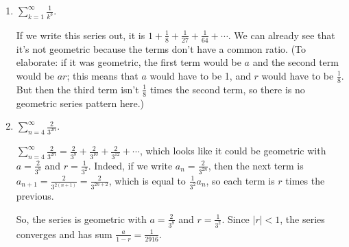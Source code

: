 \documentclass[main]{subfiles}
\begin{document}
\begin{enumerate}[resume]
\begin{enumerate}
\begin{solution}
    To see whether the series really is geometric, we need to make sure
    that the rest of the series follows the pattern that each term is
    $r$ times the previous term.

    If we write the $k$-th term as $a_k = \frac{(-1)^k 2^{k+1}}{3^k}$,
    then the next term is $a_{k+1} = \frac{(-1)^{k + 1} 2^{k+2}}{3^{k +
    1}}$, which is indeed equal to $-\frac{2}{3} a_k$.  So, the
    series is geometric with $a = -\frac{4}{3}$ and $r = -\frac{2}{3}$.
    Since $|r| < 1$, the series converges, and its sum is $\frac{a}{1 -
    r} = -\frac{4}{5}$.
    \end{solution}

    \item
    \begin{problem}[\vfill]
    $\displaystyle \sum_{k=1}^{\infty} \frac{1}{k^3}$.
    \end{problem}

    \begin{solution}
    If we write this series out, it is $1 + \frac{1}{8} + \frac{1}{27} +
    \frac{1}{64} + \cdots$.  We can already see that it's not geometric
    because the terms don't have a common ratio.  (To elaborate: if it
    was geometric, the first term would be $a$ and the second term would
    be $ar$; this means that $a$ would have to be 1, and $r$ would have
    to be $\frac{1}{8}$.  But then the third term isn't $\frac{1}{8}$ times the second term,
    so there is no geometric series pattern here.)
    \end{solution}

    \item
    \begin{problem}[\vfill]
    $\displaystyle \sum_{n=4}^{\infty} \frac{2}{3^{2n}}$.
    \end{problem}

    \begin{solution}
    $\displaystyle \sum_{n=4}^{\infty} \frac{2}{3^{2n}} = \frac{2}{3^8}
    + \frac{2}{3^{10}} + \frac{2}{3^{12}} + \cdots$, which looks like it
    could be geometric with $a = \frac{2}{3^8}$ and $r =
    \frac{1}{3^2}$.  Indeed, if we write $a_n = \frac{2}{3^{2n}}$, then
    the next term is $a_{n+1} = \frac{2}{3^{2 (n+ 1)}} = \frac{2}{3^{2n
    + 2}}$, which is equal to $\frac{1}{3^2} a_n$, so each term is
    $r$ times the previous.

    So, the series is geometric with $a = \frac{2}{3^8}$ and $r =
    \frac{1}{3^2}$.  Since $|r| < 1$, the series converges and has sum
    $\frac{a}{1 - r} = \frac{1}{2916}$.
    \end{solution}
\end{enumerate} 


\end{enumerate}
\end{document}
